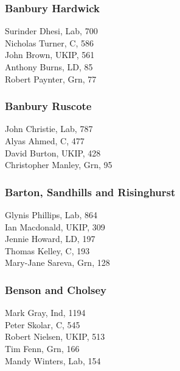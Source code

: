 \documentclass[a4paper,openany,10pt]{book}
\begin{document}
\subsubsection*{Banbury Hardwick}



Surinder Dhesi, Lab, 700\\
Nicholas Turner, C, 586\\
John Brown, UKIP, 561\\
Anthony Burns, LD, 85\\
Robert Paynter, Grn, 77\\


\subsubsection*{Banbury Ruscote}



John Christie, Lab, 787\\
Alyas Ahmed, C, 477\\
David Burton, UKIP, 428\\
Christopher Manley, Grn, 95\\


\subsubsection*{Barton, Sandhills and Risinghurst}



Glynis Phillips, Lab, 864\\
Ian Macdonald, UKIP, 309\\
Jennie Howard, LD, 197\\
Thomas Kelley, C, 193\\
Mary-Jane Sareva, Grn, 128\\


\subsubsection*{Benson and Cholsey}



Mark Gray, Ind, 1194\\
Peter Skolar, C, 545\\
Robert Nielsen, UKIP, 513\\
Tim Fenn, Grn, 166\\
Mandy Winters, Lab, 154\\
\end{document}

